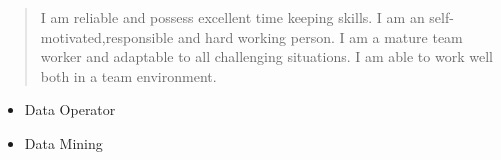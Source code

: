 \documentclass[10pt,a4paper,ragged2e,withhyper]{altacv}
\begin{document}
\begin{paracol}{2}
        
        
        
        
        \newpage
        
        \switchcolumn
        
            \begin{quote}
             I am reliable and possess excellent time keeping skills. I am an self-motivated,responsible and hard working person. I am a mature team worker and adaptable to all challenging situations. I am able to work well both in a team environment.   
            \end{quote}
        
            \begin{itemize}
                \item Data Operator
                \item Data Mining
                

\end{itemize}
\end{paracol}
\end{document}
